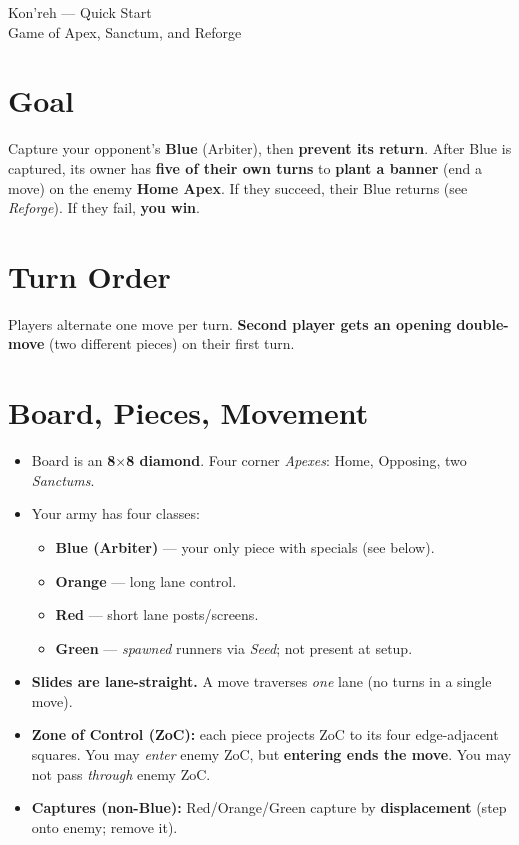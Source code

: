 \documentclass[11pt]{article}
\begin{document}
\begin{center}
{\LARGE Kon'reh — Quick Start}\\
\vspace{0.25em}
{\small Game of Apex, Sanctum, and Reforge}
\end{center}

\section*{Goal}
Capture your opponent’s \textbf{Blue} (Arbiter), then \textbf{prevent its return}. After Blue is captured, its owner has \textbf{five of their own turns} to \textbf{plant a banner} (end a move) on the enemy \textbf{Home Apex}. If they succeed, their Blue returns (see \emph{Reforge}). If they fail, \textbf{you win}. 

\section*{Turn Order}
Players alternate one move per turn. \textbf{Second player gets an opening double-move} (two different pieces) on their first turn.

\section*{Board, Pieces, Movement}
\begin{itemize}
  \item Board is an \textbf{8$\times$8 diamond}. Four corner \emph{Apexes}: Home, Opposing, two \emph{Sanctums}.
  \item Your army has four classes:
    \begin{itemize}
      \item \textbf{Blue (Arbiter)} — your only piece with specials (see below).
      \item \textbf{Orange} — long lane control.
      \item \textbf{Red} — short lane posts/screens.
      \item \textbf{Green} — \emph{spawned} runners via \emph{Seed}; not present at setup.
    \end{itemize}
  \item \textbf{Slides are lane-straight.} A move traverses \emph{one} lane (no turns in a single move).
  \item \textbf{Zone of Control (ZoC):} each piece projects ZoC to its four edge-adjacent squares. You may \emph{enter} enemy ZoC, but \textbf{entering ends the move}. You may not pass \emph{through} enemy ZoC.
  \item \textbf{Captures (non-Blue):} Red/Orange/Green capture by \textbf{displacement} (step onto enemy; remove it).
\end{itemize}
\end{document}

